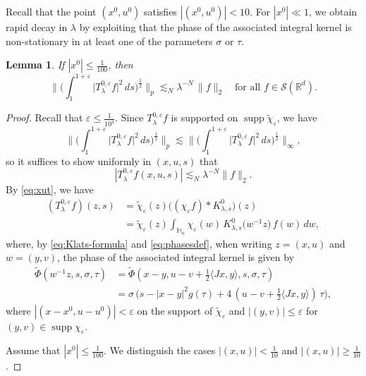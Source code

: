 \documentclass[leqno]{amsart}
\newtheorem{lemma}[theorem]{Lemma}
\theoremstyle{definition}
\theoremstyle{remark}
\numberwithin{equation}{section}
\newcommand{\R}{\mathbb{R}}
\newcommand{\eps}{\varepsilon}
\DeclareMathOperator*{\supp}{supp}
\newcommand\bbH{{\mathbb {H}}}
\newcommand\ve{{\varepsilon}}
\begin{document}
Recall that the point $(x^0,u^0)$ satisfies $|(x^0,u^0)|<10$. For $|x^0|\ll 1$, we obtain  rapid decay in $\lambda$ by exploiting that the phase of the associated integral kernel is non-stationary in at least one of the parameters $\sigma$ or $\tau$.

\begin{lemma}\label{lem:0-x0-small}
If $|x^0|\le \frac 1 {100}$, then 
\[
\Big\| \Big( \int_1^{1+\ve} \big| T^{0,\varepsilon}_\lambda f \big|^2 \, ds \Big)^{\frac{1}{2}} \Big\|_p
\lesssim_N \lambda^{-N} \, \|f\|_2 \quad \text{for all } f\in \mathcal S(\R^d).
\]
\end{lemma}

\begin{proof}
Recall that $\varepsilon\le \frac 1 {10^{4}}$.
Since $T^{0,\varepsilon}_\lambda f$ is supported on $\supp \tilde\chi_\varepsilon$, we have
\[
\Big\| \Big( \int_1^{1+\ve} \big| T^{0,\varepsilon}_\lambda f \big|^2 \, ds \Big)^{\frac{1}{2}} \Big\|_p
\lesssim 
\Big\| \Big( \int_1^{1+\ve} \big| T^{0,\varepsilon}_\lambda f \big|^2 \, ds \Big)^{\frac{1}{2}} \Big\|_\infty,
\]
so it suffices to show uniformly in $(x,u,s)$ that 
\begin{equation}\label{eq:0-x0-small-i}
|T^{0,\varepsilon}_\lambda f(x,u,s)|\lesssim_N \lambda^{-N}  \|f\|_2.
\end{equation}
By \eqref{eq:xut}, we have
\begin{align*}
(T^{0,\varepsilon}_\lambda f)(z,s)
 & = \tilde\chi_{\varepsilon}(z)\big((\chi_{\varepsilon} f)*K_{\lambda,s}^0\big) (z) \\
 & = \tilde\chi_{\varepsilon}(z)\int_{\bbH_n}\chi_{\varepsilon} (w) \,  K^0_{\lambda,s}\big(w^{-1}z\big) \, f(w)\, dw,
\end{align*}
where, by \eqref{eq:Klats-formula} and \eqref{eq:phasesdef}, when writing $z=(x,u)$ and $w=(y,v)$, the phase of the associated integral kernel is given by
\begin{align*}
\tilde \Phi(w^{-1}z,s,\sigma,\tau)
& =
\tilde \Phi(x-y,u-v+\tfrac 1 2 \langle Jx,y\rangle,s,\sigma,\tau)\\
&=\sigma\,\big(s-\left|x-y\right|^2 g(\tau) +4\, (u-v+\tfrac 1 2 \langle Jx,y\rangle)\,\tau\big),
\end{align*}
where $|(x-x^0,u-u^0)|<\eps$ on the support of $\tilde\chi_\eps$ and  $|(y,v)|\le \varepsilon$ for 
$(y,v)\in \supp \chi_\varepsilon.$


Assume that $|x^0|\le \frac 1 {100}$. We distinguish the cases $|(x,u)|<\frac 1 {10}$ and $|(x,u)|\ge \frac 1 {10}$.


\end{proof}
\end{document}
